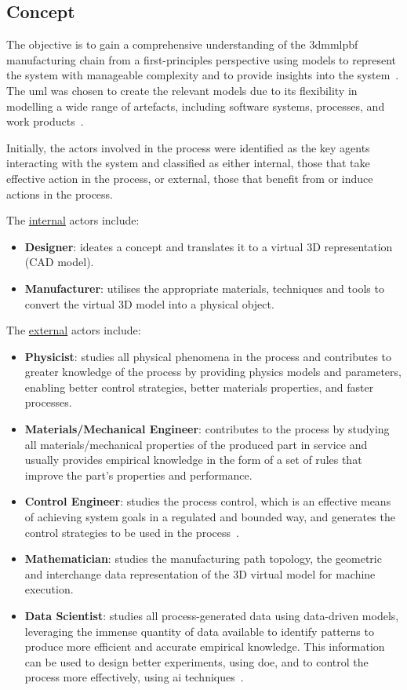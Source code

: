 \subsection{Concept}
The objective is to gain a comprehensive understanding of the \gls{3dmmlpbf} manufacturing chain from a first-principles perspective using models to represent the system with manageable complexity and to provide insights into the system~\cite{bruegge2004object}. The \gls{uml} was chosen to create the relevant models due to its flexibility in modelling a wide range of artefacts, including software systems, processes, and work products~\cite{bruegge2004object}.

Initially, the actors involved in the process were identified as the key agents
interacting with the system and classified as either internal, those that take
effective action in the process, or external, those that benefit from or induce
actions in the process.

The \underline{internal} actors include:
\begin{itemize}
\item \textbf{Designer}: ideates a concept and translates it to a virtual
  3D representation (CAD model).
\item \textbf{Manufacturer}: utilises the
  appropriate materials, techniques and tools to convert the virtual 3D model
  into a physical object.
\end{itemize}
  
The \underline{external} actors include:
\begin{itemize}
\item \textbf{Physicist}:
  studies all physical phenomena in the process and contributes to greater knowledge of the process by providing physics models and parameters, enabling better control strategies, better materials properties, and faster processes.
\item \textbf{Materials/Mechanical Engineer}:
contributes to the process by studying all materials/mechanical properties of the produced part in service and usually provides empirical knowledge in the form of a set of rules that improve the part's properties and performance.
\item \textbf{Control Engineer}:
studies the process control, which is an effective means of achieving system goals in a regulated and bounded way, and generates the control strategies to be used in the process~\cite{shamsaei2015overview}.
\item \textbf{Mathematician}: studies the manufacturing path topology, the geometric and interchange data representation of the 3D virtual model for machine execution.
\item \textbf{Data Scientist}: studies all process-generated data using
  data-driven models, leveraging the immense quantity of data available to
  identify patterns to produce more efficient and accurate empirical
  knowledge. This information can be used to design better experiments, using
  \gls{doe}, and to control the process more effectively,
  using \gls{ai} techniques~\cite{mussatto2022research, shamsaei2015overview}.
\end{itemize}

